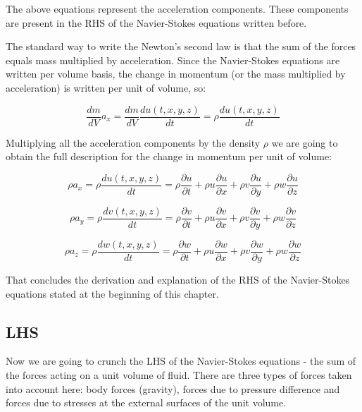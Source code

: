 The above equations represent the acceleration components. These components are present in the RHS of the Navier-Stokes equations written before.

The standard way to write the Newton's second law is that the sum of the forces equals mass multiplied by acceleration. Since the Navier-Stokes equations are written per volume basis, the change in momentum (or the mass multiplied by acceleration) is written per unit of volume, so:

\begin{equation}
\frac{dm}{dV} a_x = \frac{dm}{dV} \frac{d u(t,x,y,z)}{dt} = \rho \frac{d u(t,x,y,z)}{dt}
\end{equation}

Multiplying all the acceleration components by the density $\rho$ we are going to obtain the full description for the change in momentum per unit of volume:

\begin{equation}
\rho a_x = \rho \frac{d u(t,x,y,z)}{dt} = \rho \frac{\partial u}{\partial t} + \rho  u \frac{\partial u}{\partial x} + \rho v \frac{\partial u}{\partial y} + \rho w \frac{\partial u}{\partial z}
\end{equation}

\begin{equation}
\rho a_y = \rho \frac{d v(t,x,y,z)}{dt} = \rho \frac{\partial v}{\partial t} + \rho u \frac{\partial v}{\partial x} + \rho v \frac{\partial v}{\partial y} + \rho w \frac{\partial v}{\partial z}
\end{equation}

\begin{equation}
\rho a_z = \rho \frac{d w(t,x,y,z)}{dt} = \rho \frac{\partial w}{\partial t} + \rho u \frac{\partial w}{\partial x} + \rho v \frac{\partial w}{\partial y} + \rho w \frac{\partial w}{\partial z}
\end{equation}

That concludes the derivation and explanation of the RHS of the Navier-Stokes equations stated at the beginning of this chapter.


\subsection{LHS}

Now we are going to crunch the LHS of the Navier-Stokes equations - the sum of the forces acting on a unit volume of fluid. There are three types of forces taken into account here: body forces (gravity), forces due to pressure difference and forces due to stresses at the external surfaces of the unit volume.

